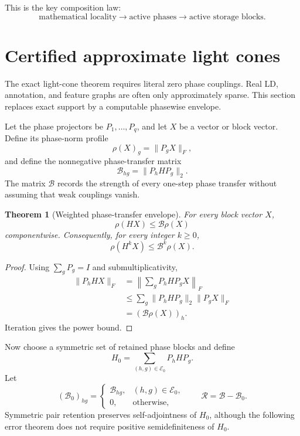 \documentclass[11pt]{article}
\newtheorem{theorem}{Theorem}[section]
\theoremstyle{definition}
\theoremstyle{remark}
\begin{document}
This is the key composition law:
\[
\boxed{
\text{mathematical locality}
\longrightarrow
\text{active phases}
\longrightarrow
\text{active storage blocks}.
}
\]

\section{Certified approximate light cones}
\label{sec:approx-lightcone}

The exact light-cone theorem requires literal zero phase couplings.  Real LD,
annotation, and feature graphs are often only approximately sparse.  This
section replaces exact support by a computable phasewise envelope.

Let the phase projectors be $P_1,\ldots,P_q$, and let $X$ be a vector or block
vector.  Define its phase-norm profile
\[
\rho(X)_g=\lVert P_gX\rVert_F,
\]
and define the nonnegative phase-transfer matrix
\[
\mathcal B_{hg}=\lVert P_hHP_g\rVert_2.
\]
The matrix $\mathcal B$ records the strength of every one-step phase transfer
without assuming that weak couplings vanish.

\begin{theorem}[Weighted phase-transfer envelope]
\label{thm:weighted-transfer}
For every block vector $X$,
\[
\boxed{
\rho(HX)\leq \mathcal B\rho(X)
}
\]
componentwise.  Consequently, for every integer $k\geq0$,
\[
\boxed{
\rho(H^kX)\leq \mathcal B^k\rho(X).
}
\]
\end{theorem}

\begin{proof}
Using $\sum_gP_g=I$ and submultiplicativity,
\[
\begin{aligned}
\lVert P_hHX\rVert_F
&=\left\lVert\sum_gP_hHP_gX\right\rVert_F\\
&\leq\sum_g\lVert P_hHP_g\rVert_2\lVert P_gX\rVert_F\\
&=(\mathcal B\rho(X))_h.
\end{aligned}
\]
Iteration gives the power bound.
\end{proof}

Now choose a symmetric set of retained phase blocks and define
\[
H_0=\sum_{(h,g)\in\mathcal E_0}P_hHP_g.
\]
Let
\[
(\mathcal B_0)_{hg}=
\begin{cases}
\mathcal B_{hg},&(h,g)\in\mathcal E_0,\\
0,&\text{otherwise},
\end{cases}
\qquad
\mathcal R=\mathcal B-\mathcal B_0.
\]
Symmetric pair retention preserves self-adjointness of $H_0$, although the
following error theorem does not require positive semidefiniteness of $H_0$.
\end{document}
